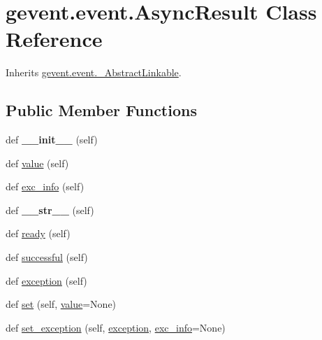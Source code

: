 \hypertarget{classgevent_1_1event_1_1_async_result}{}\section{gevent.\+event.\+Async\+Result Class Reference}
\label{classgevent_1_1event_1_1_async_result}


Inherits \hyperlink{classgevent_1_1event_1_1___abstract_linkable}{gevent.\+event.\+\_\+\+Abstract\+Linkable}.

\subsection*{Public Member Functions}
\begin{DoxyCompactItemize}
\item 
\mbox{\label{classgevent_1_1event_1_1_async_result_a7b6d053769e3151b4fbdc2de03178b22}} 
def {\bfseries \+\_\+\+\_\+init\+\_\+\+\_\+} (self)
\item 
def \hyperlink{classgevent_1_1event_1_1_async_result_a0837f2c7d2b1ef963978846c46606abe}{value} (self)
\item 
def \hyperlink{classgevent_1_1event_1_1_async_result_a09be8943a76bb5ec4982a59644005a80}{exc\+\_\+info} (self)
\item 
\mbox{\label{classgevent_1_1event_1_1_async_result_a70fe1b7a4a24e8fed8cee8a16ba6747e}} 
def {\bfseries \+\_\+\+\_\+str\+\_\+\+\_\+} (self)
\item 
def \hyperlink{classgevent_1_1event_1_1_async_result_a4b625390f5320b6921bc0c2f0afad192}{ready} (self)
\item 
def \hyperlink{classgevent_1_1event_1_1_async_result_a4fcee8b446a492d540d813c107b75ae6}{successful} (self)
\item 
def \hyperlink{classgevent_1_1event_1_1_async_result_a4eaed73fc940b8d8becc7536aa157ec1}{exception} (self)
\item 
def \hyperlink{classgevent_1_1event_1_1_async_result_a4dc750ec7ee0f71beebe3861c7c9d9af}{set} (self, \hyperlink{classgevent_1_1event_1_1_async_result_a0837f2c7d2b1ef963978846c46606abe}{value}=None)
\item 
def \hyperlink{classgevent_1_1event_1_1_async_result_a832be858eab0bbe7aa7ae343053c5555}{set\+\_\+exception} (self, \hyperlink{classgevent_1_1event_1_1_async_result_a4eaed73fc940b8d8becc7536aa157ec1}{exception}, \hyperlink{classgevent_1_1event_1_1_async_result_a09be8943a76bb5ec4982a59644005a80}{exc\+\_\+info}=None)

\end{DoxyCompactItemize}
